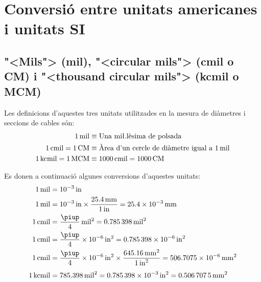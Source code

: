 \section{Conversi\'{o} entre unitats americanes i unitats SI}

\subsection{{"<}Mils{">} (mil), {"<}circular mils{">} (cmil o CM) i {"<}thousand circular mils{">} (kcmil o MCM)}\label{sec:MCM}
  

  Les definicions d'aquestes tres unitats utilitzades en la mesura de di\`{a}metres i seccions de cables s\'{o}n:
\begin{align}
  \SI{1}{mil} &\equiv \text{Una mi{\l.l}\`{e}sima de polsada} \\
  \SI{1}{cmil} = \SI{1}{CM} &\equiv  \text{\`{A}rea d'un cercle de di\`{a}metre igual a \SI{1}{mil}} \\
  \SI{1}{kcmil} = \SI{1}{MCM} &\equiv \SI{1000}{cmil} = \SI{1000}{CM}
\end{align}

  Es donen a continuaci\'{o} algunes conversions d'aquestes unitats:
\begin{align}
   \SI{1}{mil} &= \SI{e-3}{in}  \\
  \SI{1}{mil} &= \SI{e-3}{in} \times \frac{\SI{25,4}{mm}}{\SI{1}{in}} = \SI{25,4e-3}{mm}  \\
  \SI{1}{cmil} &= \frac{\piup}{4}\unit{mil^2} = \SI{0,785398}{mil^2}   \\
   \SI{1}{cmil} &= \frac{\piup}{4}\times \SI{e-6}{in^2} = \SI{0,785398e-6}{in^2} \\
   \SI{1}{cmil} &= \frac{\piup}{4} \times \SI{e-6}{in^2} \times \frac{\SI{645,16}{mm^2}}{\SI{1}{in^2}} = \SI{506,7075e-6}{mm^2}
   \\[1ex]
   \SI{1}{kcmil} &= \SI{785,398}{mil^2}  = \SI{0,785398e-3}{in^2} = \SI{0,5067075}{mm^2}
\end{align}

